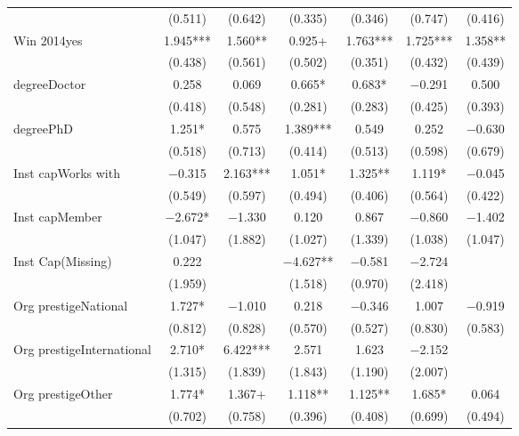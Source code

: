 \begin{table}
\begin{tabular}[t]{lcccccc}
 & (\num{0.511}) & (\num{0.642}) & (\num{0.335}) & (\num{0.346}) & (\num{0.747}) & (\num{0.416})\\
Win 2014yes & \num{1.945}*** & \num{1.560}** & \num{0.925}+ & \num{1.763}*** & \num{1.725}*** & \num{1.358}**\\
 & (\num{0.438}) & (\num{0.561}) & (\num{0.502}) & (\num{0.351}) & (\num{0.432}) & (\num{0.439})\\
degreeDoctor & \num{0.258} & \num{0.069} & \num{0.665}* & \num{0.683}* & \num{-0.291} & \num{0.500}\\
 & (\num{0.418}) & (\num{0.548}) & (\num{0.281}) & (\num{0.283}) & (\num{0.425}) & (\num{0.393})\\
degreePhD & \num{1.251}* & \num{0.575} & \num{1.389}*** & \num{0.549} & \num{0.252} & \num{-0.630}\\
 & (\num{0.518}) & (\num{0.713}) & (\num{0.414}) & (\num{0.513}) & (\num{0.598}) & (\num{0.679})\\
Inst capWorks with & \num{-0.315} & \num{2.163}*** & \num{1.051}* & \num{1.325}** & \num{1.119}* & \num{-0.045}\\
 & (\num{0.549}) & (\num{0.597}) & (\num{0.494}) & (\num{0.406}) & (\num{0.564}) & (\num{0.422})\\
Inst capMember & \num{-2.672}* & \num{-1.330} & \num{0.120} & \num{0.867} & \num{-0.860} & \num{-1.402}\\
 & (\num{1.047}) & (\num{1.882}) & (\num{1.027}) & (\num{1.339}) & (\num{1.038}) & (\num{1.047})\\
Inst Cap(Missing) & \num{0.222} &  & \num{-4.627}** & \num{-0.581} & \num{-2.724} & \\
 & (\num{1.959}) &  & (\num{1.518}) & (\num{0.970}) & (\num{2.418}) & \\
Org prestigeNational & \num{1.727}* & \num{-1.010} & \num{0.218} & \num{-0.346} & \num{1.007} & \num{-0.919}\\
 & (\num{0.812}) & (\num{0.828}) & (\num{0.570}) & (\num{0.527}) & (\num{0.830}) & (\num{0.583})\\
Org prestigeInternational & \num{2.710}* & \num{6.422}*** & \num{2.571} & \num{1.623} & \num{-2.152} & \\
 & (\num{1.315}) & (\num{1.839}) & (\num{1.843}) & (\num{1.190}) & (\num{2.007}) & \\
Org prestigeOther & \num{1.774}* & \num{1.367}+ & \num{1.118}** & \num{1.125}** & \num{1.685}* & \num{0.064}\\
 & (\num{0.702}) & (\num{0.758}) & (\num{0.396}) & (\num{0.408}) & (\num{0.699}) & (\num{0.494})\\

\end{tabular}
\end{table}
